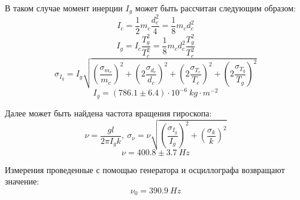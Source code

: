 \documentclass[14pt, a4paper]{article}
\begin{document}
В таком случае момент инерции $I_g$ может быть рассчитан следующим образом:
\[I_c=\frac{1}{2}m_c\frac{d_c^2}{4}=\frac{1}{8}m_cd_c^2\]
\[I_g=I_c\frac{T_g^2}{T_c^2}=\frac{1}{8}m_cd_c^2\frac{T_g^2}{T_c^2}\]
\[\sigma_{I_g}=I_g\sqrt{\left(\frac{\sigma_{m_c}}{m_c}\right)^{2}+\left(2\frac{\sigma_{d_c}}{d_c}\right)^{2}+\left(2\frac{\sigma_{T_c}}{T_c}\right)^{2}+\left(2\frac{\sigma_{T_g}}{T_g}\right)^{2}}\]
\[I_g=(786.1\pm6.4)\cdot10^{-6}\ kg\cdot m^{-2}\]

Далее может быть найдена частота вращения гироскопа:
\[\nu=\frac{gl}{2\pi I_gk},\ \sigma_\nu=\nu\sqrt{\left(\frac{\sigma_{I_g}}{I_g}\right)^{2}+\left(\frac{\sigma_{k}}{k}\right)^{2}}\]
\[\nu=400.8\pm3.7\ Hz\]

Измерения проведенные с помощью генератора и осциллографа возвращают значение:
\[\nu_0=390.9\ Hz\]
\end{document}
